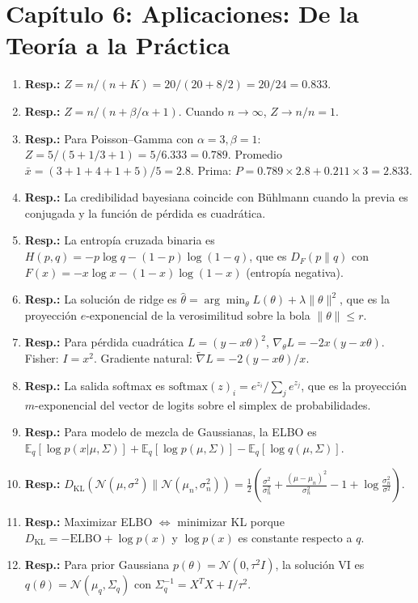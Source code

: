 \section*{Capítulo 6: Aplicaciones: De la Teoría a la Práctica}

\begin{enumerate}
	\item \textbf{Resp.:} $Z = n/(n+K) = 20/(20+8/2) = 20/24 = 0.833$.
	\item \textbf{Resp.:} $Z = n/(n + \beta/\alpha + 1)$.  Cuando $n \to \infty$, $Z \to n/n = 1$.
	\item \textbf{Resp.:} Para Poisson--Gamma con $\alpha=3, \beta=1$: $Z = 5/(5 + 1/3 + 1) = 5/6.333 = 0.789$.  Promedio $\bar{x} = (3+1+4+1+5)/5 = 2.8$.  Prima: $P = 0.789 \times 2.8 + 0.211 \times 3 = 2.833$.
	\item \textbf{Resp.:} La credibilidad bayesiana coincide con Bühlmann cuando la previa es conjugada y la función de pérdida es cuadrática.
	\item \textbf{Resp.:} La entropía cruzada binaria es $H(p, q) = -p\log q - (1-p)\log(1-q)$, que es $D_F(p \| q)$ con $F(x) = -x\log x - (1-x)\log(1-x)$ (entropía negativa).
	\item \textbf{Resp.:} La solución de ridge es $\hat\theta = \arg\min_\theta L(\theta) + \lambda\|\theta\|^2$, que es la proyección $e$-exponencial de la verosimilitud sobre la bola $\|\theta\| \le r$.
	\item \textbf{Resp.:} Para pérdida cuadrática $L = (y - x\theta)^2$, $\nabla_\theta L = -2x(y-x\theta)$.  Fisher: $I = x^2$.  Gradiente natural: $\tilde{\nabla} L = -2(y-x\theta)/x$.
	\item \textbf{Resp.:} La salida softmax es $\text{softmax}(z)_i = e^{z_i}/\sum_j e^{z_j}$, que es la proyección $m$-exponencial del vector de logits sobre el simplex de probabilidades.
	\item \textbf{Resp.:} Para modelo de mezcla de Gaussianas, la ELBO es $\mathbb{E}_q[\log p(x|\mu,\Sigma)] + \mathbb{E}_q[\log p(\mu,\Sigma)] - \mathbb{E}_q[\log q(\mu,\Sigma)]$.
	\item \textbf{Resp.:} $D_{\mathrm{KL}}(\mathcal{N}(\mu,\sigma^2) \| \mathcal{N}(\mu_n,\sigma_n^2)) = \frac{1}{2}\left(\frac{\sigma^2}{\sigma_n^2} + \frac{(\mu-\mu_n)^2}{\sigma_n^2} - 1 + \log\frac{\sigma_n^2}{\sigma^2}\right)$.
	\item \textbf{Resp.:} Maximizar ELBO $\iff$ minimizar KL porque $D_{\mathrm{KL}} = -\mathrm{ELBO} + \log p(x)$ y $\log p(x)$ es constante respecto a $q$.
	\item \textbf{Resp.:} Para prior Gaussiana $p(\theta) = \mathcal{N}(0, \tau^2 I)$, la solución VI es $q(\theta) = \mathcal{N}(\mu_q, \Sigma_q)$ con $\Sigma_q^{-1} = X^TX + I/\tau^2$.

\end{enumerate}
